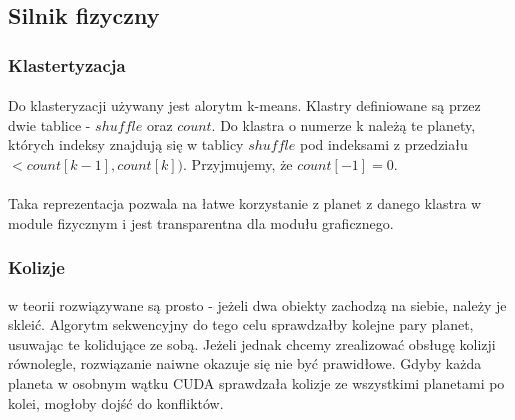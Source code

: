 
\subsection{Silnik fizyczny}

\subsubsection{Klastertyzacja}

\paragraph{} Do klasteryzacji używany jest alorytm k-means. Klastry definiowane są przez dwie tablice - \ensuremath{shuffle} oraz \ensuremath{count}. Do klastra o numerze k należą te planety, których indeksy znajdują się w tablicy \ensuremath{shuffle} pod indeksami z przedziału \ensuremath{< count[k-1], count[k] )}. Przyjmujemy, że \ensuremath{count[-1] = 0}.

\paragraph{} Taka reprezentacja pozwala na łatwe korzystanie z planet z danego klastra w module fizycznym i jest transparentna dla modułu graficznego.

\subsubsection{Kolizje} w teorii rozwiązywane są prosto - jeżeli dwa obiekty zachodzą na siebie, należy je skleić. Algorytm sekwencyjny do tego celu sprawdzałby kolejne pary planet, usuwając te kolidujące ze sobą. Jeżeli jednak chcemy zrealizować obsługę kolizji równolegle, rozwiązanie naiwne okazuje się nie być prawidłowe. Gdyby każda planeta w osobnym wątku CUDA sprawdzała kolizje ze wszystkimi planetami po kolei, mogłoby dojść do konfliktów.

